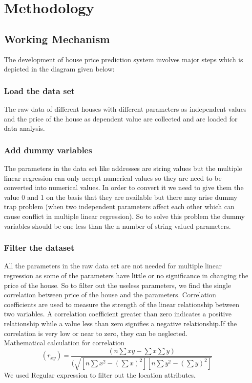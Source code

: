 \chapter{Methodology}
  \section{Working Mechanism}
The development of house price prediction system involves major steps which is 
depicted in the diagram given below:
\begin{figure}[tbh] %
\begin{center}
\end{center}
\end{figure}
\subsection{Load the data set}
The raw data of different houses with different parameters as independent values and the price of the house as dependent value are collected and are loaded for data analysis.
\subsection{Add dummy variables}
The parameters in the data set like addresses are string values but the multiple linear regression can only accept numerical values so they are need to be converted into numerical values. In order to convert it we need to give them the value 0 and 1 on the basis that they are available but there may arise dummy trap problem (when two independent parameters affect each other which can cause conflict in multiple linear regression). So to solve this problem the dummy variables should be one less than the n number of string valued parameters.
\subsection{Filter the dataset}
All the parameters in the raw data set are not needed for multiple linear regression as some of the parameters have little or no significance in changing the price of the house. So to filter out the useless parameters, we find the single correlation between price of the house and the parameters. Correlation coefficients are used to measure the strength of the linear relationship between two variables. A correlation coefficient greater than zero indicates a positive relationship while a value less than zero signifies a negative relationship.If the correlation is very low or near to zero, they can be neglected.\\
Mathematical calculation for correlation
\begin{equation}
(r_{xy}) =\frac {(n\sum{xy}-\sum{x}\sum{y})}{(\sqrt{[n\sum{x^2}-(\sum{x})^2][n\sum{y^2}-(\sum{y})^2]}}
\end{equation}
We used Regular expression to filter out the location attributes.

